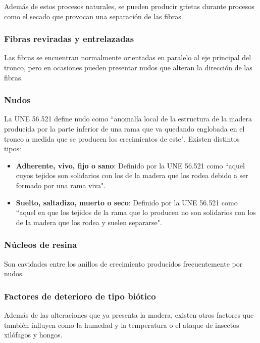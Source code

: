 Además de estos procesos naturales, se pueden producir grietas durante procesos como el secado que provocan una separación de las fibras.

\subsubsection{Fibras reviradas y entrelazadas}

Las fibras se encuentran normalmente orientadas en paralelo al eje principal del tronco, pero en ocasiones pueden presentar nudos que alteran la dirección de las fibras.

\subsubsection{Nudos}

La UNE 56.521 define nudo como ``anomalía local de la estructura de la madera producida por la parte inferior de una rama que va quedando englobada en el tronco a medida que se producen los crecimientos de este". Existen distintos tipos:

\begin{itemize}
	\item \textbf{Adherente, vivo, fijo o sano}: Definido por la UNE 56.521 como ``aquel cuyos tejidos son solidarios con los de la madera que los rodea debido a ser formado por una rama viva".
	\item \textbf{Suelto, saltadizo, muerto o seco}: Definido por la UNE 56.521 como ``aquel en que los tejidos de la rama que lo producen no son solidarios con los de la madera que los rodea y suelen separarse".
\end{itemize}

\subsubsection{Núcleos de resina}

Son cavidades entre los anillos de crecimiento producidos frecuentemente por nudos.

\subsubsection{Factores de deterioro de tipo biótico}

Además de las alteraciones que ya presenta la madera, existen otros factores que también influyen como la humedad y la temperatura o el ataque de insectos xilófagos y hongos.

